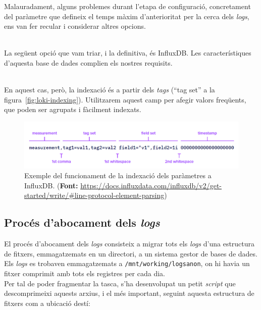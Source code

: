 \noindent
Malauradament, alguns problemes durant l’etapa de configuració, concretament del paràmetre que defineix el temps màxim d'anterioritat per la cerca dels \textit{\gls{log}s}, ens van fer recular i considerar altres opcions.

\noindent \\
La següent opció que vam triar, i la definitiva, és InfluxDB.
Les característiques d'aquesta base de dades complien els nostres requisits.

\noindent \\
En aquest cas, però, la indexació és a partir dels \textit{tags} (``tag set'' a la figura~\ref{fig:loki-indexing}).
Utilitzarem aquest camp per afegir valors freqüents, que poden ser agrupats i fàcilment indexats.

\begin{figure}[htbp]
    \centerline{\includegraphics[width=1\textwidth]{figures/influxdb-indexing}}
    \captionsetup{justification=centering}
    \caption[Exemple del funcionament de la indexació dels paràmetres a InfluxDB.]{Exemple del funcionament de la indexació dels paràmetres a InfluxDB. (\textbf{Font:} \url{https://docs.influxdata.com/influxdb/v2/get-started/write/\#line-protocol-element-parsing})}\label{fig:influxdb-indexing}
\end{figure}

\clearpage

\subsection{Procés d'abocament dels \textit{\gls{log}s}}\label{subsec:log-push}

\noindent
El procés d’abocament dels \textit{\gls{log}s} consisteix a migrar tots els \textit{\gls{log}s} d’una estructura de fitxers, emmagatzemats en un directori, a un sistema gestor de bases de dades. \\

\noindent
Els \textit{\gls{log}s} es trobaven emmagatzemats a \texttt{/mnt/working/logsanon}, on hi havia un fitxer comprimit amb tots els registres per cada dia. \\

\noindent
Per tal de poder fragmentar la tasca, s’ha desenvolupat un petit \textit{script} que descomprimeixi aquests arxius, i el més important, seguint aquesta estructura de fitxers com a ubicació destí:

